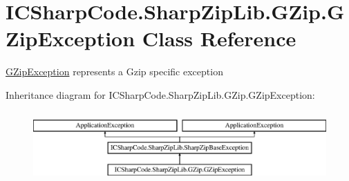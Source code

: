 \hypertarget{class_i_c_sharp_code_1_1_sharp_zip_lib_1_1_g_zip_1_1_g_zip_exception}{}\section{I\+C\+Sharp\+Code.\+Sharp\+Zip\+Lib.\+G\+Zip.\+G\+Zip\+Exception Class Reference}
\label{class_i_c_sharp_code_1_1_sharp_zip_lib_1_1_g_zip_1_1_g_zip_exception}


\hyperlink{class_i_c_sharp_code_1_1_sharp_zip_lib_1_1_g_zip_1_1_g_zip_exception}{G\+Zip\+Exception} represents a Gzip specific exception  


Inheritance diagram for I\+C\+Sharp\+Code.\+Sharp\+Zip\+Lib.\+G\+Zip.\+G\+Zip\+Exception\+:\begin{figure}[H]
\begin{center}
\leavevmode
\includegraphics[height=2.709677cm]{class_i_c_sharp_code_1_1_sharp_zip_lib_1_1_g_zip_1_1_g_zip_exception}
\end{center}
\end{figure}

